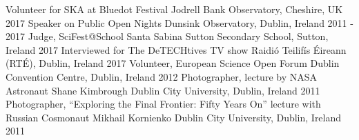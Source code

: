 \begin{cvpress}
   \cvpres
   	{Volunteer for SKA at Bluedot Festival}
    {Jodrell Bank Observatory, Cheshire, UK}
    {2017}
   \cvpres
   	{Speaker on Public Open Nights}
    {Dunsink Observatory, Dublin, Ireland}
    {2011 - 2017}
   \cvpres
   	{Judge, SciFest@School}
    {Santa Sabina Sutton Secondary School, Sutton, Ireland}
    {2017}
   \cvpres
   	{Interviewed for The DeTECHtives TV show}
    {Raidi{\'o} Teilif{\'i}s {\'E}ireann (RT{\'E}), Dublin, Ireland}
    {2017}
   \cvpres
   	{Volunteer, European Science Open Forum}
    {Dublin Convention Centre, Dublin, Ireland}
    {2012}
   \cvpres
   	{Photographer, lecture by NASA Astronaut Shane Kimbrough}
    {Dublin City University, Dublin, Ireland}
    {2011}
   \cvpres
   	{Photographer, ``Exploring the Final Frontier: Fifty Years On'' lecture with Russian Cosmonaut Mikhail Kornienko}
    {Dublin City University, Dublin, Ireland}
    {2011}
\end{cvpress}


